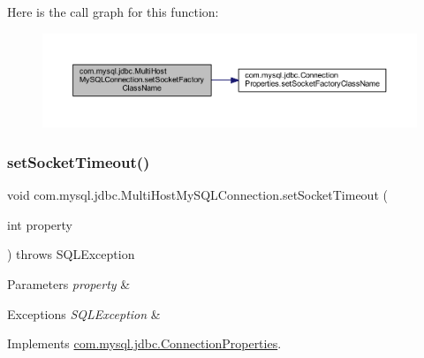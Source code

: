 Here is the call graph for this function\+:
\nopagebreak
\begin{figure}[H]
\begin{center}
\leavevmode
\includegraphics[width=350pt]{classcom_1_1mysql_1_1jdbc_1_1_multi_host_my_s_q_l_connection_a24d505e2b23813fa2186aae41633b5de_cgraph}
\end{center}
\end{figure}
\mbox{\label{classcom_1_1mysql_1_1jdbc_1_1_multi_host_my_s_q_l_connection_ab71cfc835c4fb153654b63f887c41df0}} 
\subsubsection{\texorpdfstring{set\+Socket\+Timeout()}{setSocketTimeout()}}
{\footnotesize\ttfamily void com.\+mysql.\+jdbc.\+Multi\+Host\+My\+S\+Q\+L\+Connection.\+set\+Socket\+Timeout (\begin{DoxyParamCaption}\item[{int}]{property }\end{DoxyParamCaption}) throws S\+Q\+L\+Exception}


\begin{DoxyParams}{Parameters}
{\em property} & \\
\hline
\end{DoxyParams}

\begin{DoxyExceptions}{Exceptions}
{\em S\+Q\+L\+Exception} & \\
\hline
\end{DoxyExceptions}


Implements \mbox{\hyperlink{interfacecom_1_1mysql_1_1jdbc_1_1_connection_properties_a9c60457be4c5136f4c9a46d849b4a5b9}{com.\+mysql.\+jdbc.\+Connection\+Properties}}.


